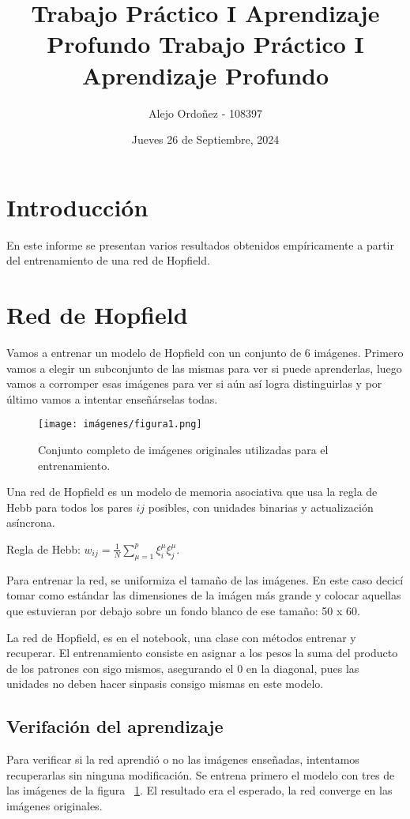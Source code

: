 \documentclass[a4paper,12pt]{article}
\title{Trabajo Práctico I Aprendizaje Profundo}
\title{%
  Trabajo Práctico I \\
  \large Aprendizaje Profundo}
\author{Alejo Ordoñez - 108397}
\date{Jueves 26 de Septiembre, 2024}
\begin{document}
\maketitle

\newpage
\tableofcontents


\newpage
\section{Introducción}

En este informe se presentan varios resultados obtenidos empíricamente a partir del entrenamiento de una red de Hopfield.\textit{}

\newpage
\section{Red de Hopfield}
Vamos a entrenar un modelo de Hopfield con un conjunto de 6 imágenes. Primero vamos a elegir un subconjunto de las mismas para ver si puede aprenderlas, luego vamos a corromper esas imágenes para ver si aún así logra distinguirlas y por último vamos a intentar enseñárselas todas.

\begin{figure}[!h]
    \centering
    \texttt{[image: imágenes/figura1.png]}
    \caption{Conjunto completo de imágenes originales utilizadas para el entrenamiento.}
    \label{fig:figura1}
\end{figure}

Una red de Hopfield es un modelo de memoria asociativa que usa la regla de Hebb para todos los pares $ij$ posibles, con unidades binarias y actualización asíncrona.

Regla de Hebb: $w_{ij} = \frac{1}{N} \sum_{\mu=1}^{p} \xi_{i}^{\mu} \xi_{j}^{\mu}$.

Para entrenar la red, se uniformiza el tamaño de las imágenes. En este caso decicí tomar como estándar las dimensiones de la imágen más grande y colocar aquellas que estuvieran por debajo sobre un fondo blanco de ese tamaño: 50 x 60.

La red de Hopfield, es en el notebook, una clase con métodos entrenar y recuperar. El entrenamiento consiste en asignar a los pesos la suma del producto de los patrones con sigo mismos, asegurando el 0 en la diagonal, pues las unidades no deben hacer sinpasis consigo mismas en este modelo.

\subsection{Verifación del aprendizaje}
Para verificar si la red aprendió o no las imágenes enseñadas, intentamos recuperarlas sin ninguna modificación. Se entrena primero el modelo con tres de las imágenes de la figura ~\ref{fig:figura1}. El resultado era el esperado, la red converge en las imágenes originales.
\end{document}
